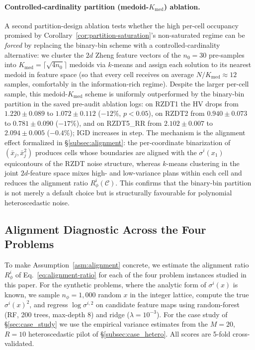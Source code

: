 \documentclass[12pt]{article}
\theoremstyle{plain}
\theoremstyle{definition}
\theoremstyle{remark}
\begin{document}
\paragraph{Controlled-cardinality partition (medoid-$K_{\mathrm{med}}$) ablation.}
A second partition-design ablation tests whether the high per-cell
occupancy promised by Corollary~\ref{cor:partition-saturation}'s
non-saturated regime can be \emph{forced} by replacing the binary-bin
scheme with a controlled-cardinality alternative: we cluster the $2d$
Zheng feature vectors of the $n_0=30$ pre-samples into
$K_{\mathrm{med}}=\lceil\sqrt{4 n_0}\rceil$ medoids via $k$-means and assign each
solution to its nearest medoid in feature space (so that every cell
receives on average $N/K_{\mathrm{med}}\approx 12$ samples, comfortably in the
information-rich regime).  Despite the larger per-cell sample, this
medoid-$K_{\mathrm{med}}$ scheme is uniformly outperformed by the
binary-bin partition in the saved pre-audit ablation logs: on RZDT1
the HV drops from $1.220\pm 0.089$ to
$1.072\pm 0.112$ ($-12\%$, $p<0.05$), on RZDT2 from $0.940\pm 0.073$ to
$0.781\pm 0.090$ ($-17\%$), and on RZDT5\_RR from $2.102\pm 0.007$ to
$2.094\pm 0.005$ ($-0.4\%$); IGD increases in step.  The mechanism is
the alignment effect formalized in \S\ref{subsec:alignment}: the
per-coordinate binarization of $(\bar x_j,\bar x_j^{2})$ produces cells
whose boundaries are aligned with the $\sigma^{i}(x_1)$ equicontours
of the RZDT noise structure, whereas $k$-means clustering in the joint
$2d$-feature space mixes high- and low-variance plans within each cell
and reduces the alignment ratio $R_\phi^{i}(\mathcal{C})$.  This
confirms that the binary-bin partition is not merely a default choice
but is structurally favourable for polynomial heteroscedastic noise.


\subsection{Alignment Diagnostic Across the Four Problems}\label{subsec:exp_alignment_diag}

To make Assumption~\ref{asm:alignment} concrete, we estimate the
alignment ratio $R_\phi^i$ of Eq.~\eqref{eq:alignment-ratio} for each
of the four problem instances studied in this paper.  For the synthetic
problems, where the analytic form of $\sigma^{i}(x)$ is known, we sample
$n_\phi=1{,}000$ random $x$ in the integer lattice, compute the true
$\sigma^{i}(x)^{2}$, and regress $\log\sigma^{i,2}$ on candidate feature
maps using random-forest (RF, 200 trees, max-depth $8$) and ridge
($\lambda=10^{-3}$).  For the case study of \S\ref{sec:case_study} we
use the empirical variance estimates from the $M=20$, $R=10$
heteroscedastic pilot of \S\ref{subsec:case_hetero}.  All scores are
5-fold cross-validated.
\end{document}
